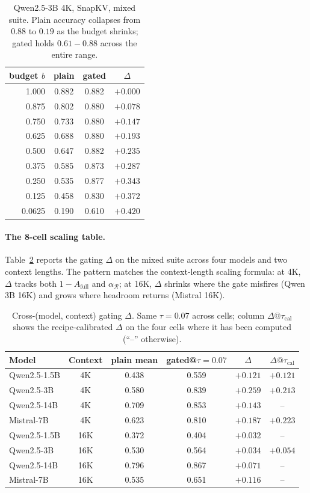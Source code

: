 \begin{table}[h]
\centering
\caption{Qwen2.5-3B 4K, SnapKV, mixed suite. Plain accuracy collapses
from $0.88$ to $0.19$ as the budget shrinks; gated holds $0.61-0.88$
across the entire range.}
\label{tab:qwen3b-curve}
\begin{tabular}{rccc}
\toprule
budget $b$ & plain & gated & $\Delta$ \\
\midrule
1.000  & 0.882 & 0.882 & $+0.000$ \\
0.875  & 0.802 & 0.880 & $+0.078$ \\
0.750  & 0.733 & 0.880 & $+0.147$ \\
0.625  & 0.688 & 0.880 & $+0.193$ \\
0.500  & 0.647 & 0.882 & $+0.235$ \\
0.375  & 0.585 & 0.873 & $+0.287$ \\
0.250  & 0.535 & 0.877 & $+0.343$ \\
0.125  & 0.458 & 0.830 & $+0.372$ \\
0.0625 & 0.190 & 0.610 & $+0.420$ \\
\bottomrule
\end{tabular}
\end{table}

\paragraph{The 8-cell scaling table.} Table~\ref{tab:scaling} reports the
gating $\Delta$ on the mixed suite across four models and two context
lengths. The pattern matches the context-length scaling formula: at 4K,
$\Delta$ tracks both $1 - A_{\mathrm{full}}$ and $\alpha_{\mathcal{R}}$; at
16K, $\Delta$ shrinks where the gate misfires (Qwen 3B 16K) and grows where
headroom returns (Mistral 16K).

\begin{table}[h]
\centering
\caption{Cross-(model, context) gating $\Delta$. Same $\tau = 0.07$
across cells; column $\Delta@\tau_{\mathrm{cal}}$ shows the recipe-calibrated
$\Delta$ on the four cells where it has been computed (``--'' otherwise).}
\label{tab:scaling}
\begin{tabular}{lccccc}
\toprule
Model & Context & plain mean & gated@$\tau\!=\!0.07$ & $\Delta$ &
$\Delta@\tau_{\mathrm{cal}}$ \\
\midrule
Qwen2.5-1.5B   & 4K  & 0.438 & 0.559 & $+0.121$ & $+0.121$ \\
Qwen2.5-3B     & 4K  & 0.580 & 0.839 & $+0.259$ & $+0.213$ \\
Qwen2.5-14B    & 4K  & 0.709 & 0.853 & $+0.143$ & --       \\
Mistral-7B      & 4K  & 0.623 & 0.810 & $+0.187$ & $+0.223$ \\
\midrule
Qwen2.5-1.5B   & 16K & 0.372 & 0.404 & $+0.032$ & --       \\
Qwen2.5-3B     & 16K & 0.530 & 0.564 & $+0.034$ & $+0.054$ \\
Qwen2.5-14B    & 16K & 0.796 & 0.867 & $+0.071$ & --       \\
Mistral-7B      & 16K & 0.535 & 0.651 & $+0.116$ & --       \\
\bottomrule
\end{tabular}
\end{table}

